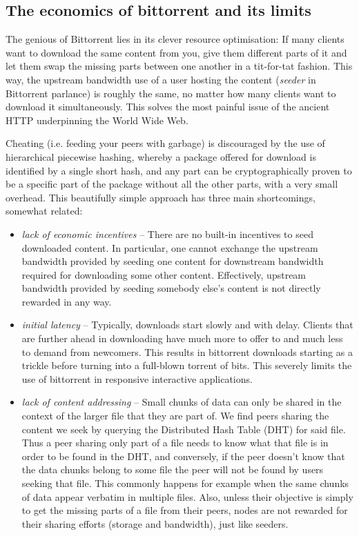 \subsection{The economics of bittorrent and its limits}

The genious of Bittorrent lies in its clever resource optimisation: If many clients want to download the same content from you, give them different parts of it and let them swap the missing parts between one another in a tit-for-tat fashion. This way, the upstream bandwidth use of a user hosting the content (\emph{seeder} in Bittorrent parlance) is roughly the same, no matter how many clients want to download it simultaneously. This solves the most painful issue of the ancient HTTP underpinning the World Wide Web.

Cheating (i.e. feeding your peers with garbage) is discouraged by the use of hierarchical piecewise hashing, whereby a package offered for download is identified by a single short hash, and any part can be cryptographically proven to be a specific part of the package without all the other parts, with a very small overhead. This beautifully simple approach has three main shortcomings, somewhat related:

\begin{itemize}
    \item \emph{lack of economic incentives} -- 
There are no built-in incentives to seed downloaded content. In particular, one cannot exchange the upstream bandwidth provided by seeding one content for downstream bandwidth required for downloading some other content. Effectively, upstream bandwidth provided by seeding somebody else's content is not directly rewarded in any way.
\item \emph{initial latency} -- 
 Typically, downloads start slowly and with delay. Clients that are further ahead in downloading have much more to offer to and much less to demand from newcomers. This results in bittorrent downloads starting as a trickle before turning into a full-blown torrent of bits. This severely limits the use of bittorrent in responsive interactive applications.
\item \emph{lack of content addressing} -- Small chunks of data can only be shared in the context of the larger file that they are part of. We find peers sharing the content we seek by querying the Distributed Hash Table (DHT) for said file. Thus a peer sharing only part of a file needs to know what that file is in order to be found in the DHT, and conversely, if the peer doesn't know that the data chunks belong to some file the peer will not be found by users seeking that file. This commonly happens for example when the same chunks of data appear verbatim in multiple files. Also, unless their objective is simply to get the missing parts of a file from their peers, nodes are not rewarded for their sharing efforts (storage and bandwidth), just like seeders.

\end{itemize}

